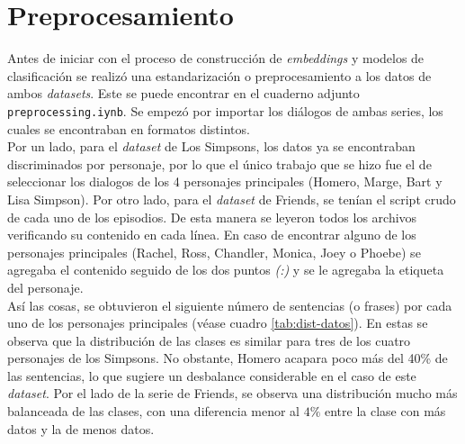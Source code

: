 \section{Preprocesamiento}

Antes de iniciar con el proceso de construcción de \textit{embeddings} y modelos de clasificación se realizó una estandarización o preprocesamiento a los datos de ambos \textit{datasets}. Este se puede encontrar en el cuaderno adjunto  \texttt{preprocessing.iynb}. Se empezó por importar los diálogos de ambas series, los cuales se encontraban en formatos distintos. \\

Por un lado, para el \textit{dataset} de Los Simpsons, los datos ya se encontraban discriminados por personaje, por lo que el único trabajo que se hizo fue el de seleccionar los dialogos de los 4 personajes principales (Homero, Marge, Bart y Lisa Simpson). Por otro lado, para el \textit{dataset} de Friends, se tenían el script crudo de cada uno de los episodios. De esta manera se leyeron todos los archivos verificando su contenido en cada línea. En caso de encontrar alguno de los personajes principales (Rachel, Ross, Chandler, Monica, Joey o Phoebe) se agregaba el contenido seguido de los dos puntos \textit{(:)} y se le agregaba la etiqueta del personaje. \\

Así las cosas, se obtuvieron el siguiente número de sentencias (o frases) por cada uno de los personajes principales (véase cuadro \ref{tab:dist-datos}). En estas se observa que la distribución de las clases es similar para tres de los cuatro personajes de los Simpsons. No obstante, Homero acapara poco más del 40\% de las sentencias, lo que sugiere un desbalance considerable en el caso de este \textit{dataset}. Por el lado de la serie de Friends, se observa una distribución mucho más balanceada de las clases, con una diferencia menor al $4\%$ entre la clase con más datos y la de menos datos. \\

